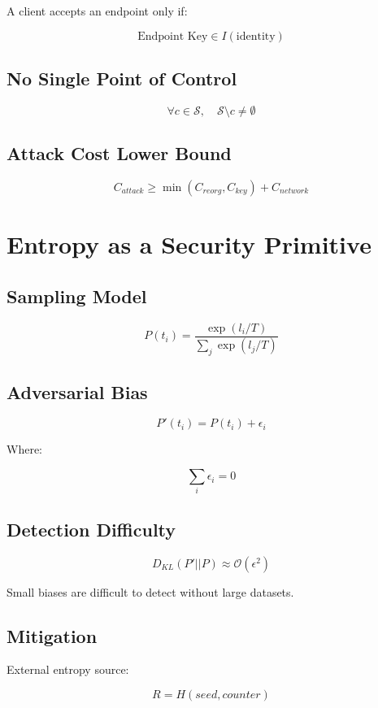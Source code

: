 \documentclass[11pt]{article}
\begin{document}
A client accepts an endpoint only if:

\[
\text{Endpoint Key} \in I(\text{identity})
\]

\subsection{No Single Point of Control}

\[
\forall c \in \mathcal{S}, \quad \mathcal{S} \setminus c \neq \emptyset
\]

\subsection{Attack Cost Lower Bound}

\[
C_{attack} \ge \min(C_{reorg}, C_{key}) + C_{network}
\]

\section{Entropy as a Security Primitive}

\subsection{Sampling Model}

\[
P(t_i) = \frac{\exp(l_i / T)}{\sum_j \exp(l_j / T)}
\]

\subsection{Adversarial Bias}

\[
P'(t_i) = P(t_i) + \epsilon_i
\]

Where:

\[
\sum_i \epsilon_i = 0
\]

\subsection{Detection Difficulty}

\[
D_{KL}(P' || P) \approx \mathcal{O}(\epsilon^2)
\]

Small biases are difficult to detect without large datasets.

\subsection{Mitigation}

External entropy source:

\[
R = H(seed, counter)
\]
\end{document}
